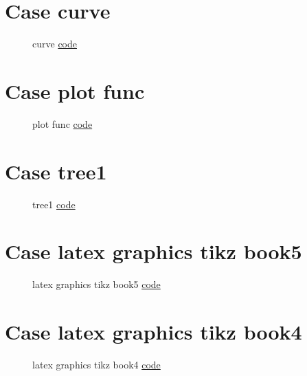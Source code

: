 \documentclass{article}
\begin{document}
\section{Case curve}

\begin{figure}[H]
	\centering
	
	\caption{curve \href{https:/github.com/cauliyang/learn_tikz/blob/main/source/curve.tex}{code} }
	\label{fig:curve}
\end{figure}

\section{Case plot func}

\begin{figure}[H]
	\centering
	
	\caption{plot func \href{https:/github.com/cauliyang/learn_tikz/blob/main/source/plot_func.tex}{code} }
	\label{fig:plot func}
\end{figure}

\section{Case tree1}

\begin{figure}[H]
	\centering
	
	\caption{tree1 \href{https:/github.com/cauliyang/learn_tikz/blob/main/source/tree1.tex}{code} }
	\label{fig:tree1}
\end{figure}

\section{Case latex graphics tikz book5}

\begin{figure}[H]
	\centering
	
	\caption{latex graphics tikz book5 \href{https:/github.com/cauliyang/learn_tikz/blob/main/source/latex_graphics_tikz_book5.tex}{code} }
	\label{fig:latex graphics tikz book5}
\end{figure}

\section{Case latex graphics tikz book4}

\begin{figure}[H]
	\centering
	
	\caption{latex graphics tikz book4 \href{https:/github.com/cauliyang/learn_tikz/blob/main/source/latex_graphics_tikz_book4.tex}{code} }
	\label{fig:latex graphics tikz book4}
\end{figure}
\end{document}
